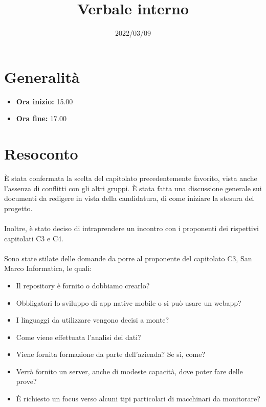 \documentclass{classes/base}
\title{Verbale interno}
\date{2022/03/09}
\author{\matteo}
\renewcommand{\maketitle}{
    
}
\begin{document}
    \maketitle

    \section*{Generalità}
    \begin{itemize}
        \item \textbf{Ora inizio:} 15.00
        \item \textbf{Ora fine:} 17.00
    \end{itemize}

    \section*{Resoconto}
    È stata confermata la scelta del capitolato precedentemente favorito, vista anche l'assenza di conflitti con gli altri gruppi.
    È stata fatta una discussione generale sui documenti da redigere in vista della candidatura, di come iniziare la stesura del progetto.
    \\\\
    Inoltre, è stato deciso di intraprendere un incontro con i proponenti dei rispettivi capitolati C3 e C4.
    \\\\
    Sono state stilate delle domande da porre al proponente del capitolato C3, San Marco Informatica, le quali:
    \begin{itemize}
        \item  Il repository è fornito o dobbiamo crearlo?
        \item  Obbligatori lo sviluppo di app native mobile o si può usare un webapp?
        \item  I linguaggi da utilizzare vengono decisi a monte? 
        \item  Come viene effettuata l'analisi dei dati?
        \item  Viene fornita formazione da parte dell'azienda? Se sì, come?
        \item  Verrà fornito un server, anche di modeste capacità, dove poter fare delle prove?
        \item  È richiesto un focus verso alcuni tipi particolari di macchinari da monitorare?
    \end{itemize}
\end{document}
